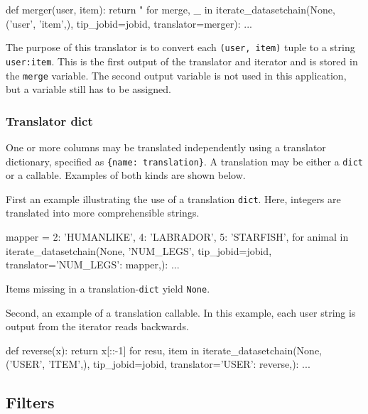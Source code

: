 \begin{python}
def merger(user, item):
    return "%
for merge, _ in iterate_datasetchain(None, ('user', 'item',), tip_jobid=jobid,
                                     translator=merger):
    ...
\end{python}
The purpose of this translator is to convert each
\texttt{(user, item)} tuple to a string \texttt{user:item}.  This is
the first output of the translator and iterator and is stored in the
\texttt{merge} variable.  The second output variable is not used in
this application, but a variable still has to be assigned.



\subsubsection*{Translator dict}

One or more columns may be translated independently using a translator
dictionary, specified as \texttt{\{name:\ translation\}}.  A
translation may be either a \texttt{dict} or a callable.  Examples of
both kinds are shown below.

First an example illustrating the use of a translation \texttt{dict}.
Here, integers are translated into more comprehensible strings.

\begin{python}
mapper = {2: 'HUMANLIKE', 4: 'LABRADOR', 5: 'STARFISH',}
for animal in iterate_datasetchain(None, 'NUM_LEGS', tip_jobid=jobid,
                                     translator={'NUM_LEGS': mapper,}):
    ...
\end{python}
Items missing in a translation-\texttt{dict} yield \texttt{None}.

Second, an example of a translation callable.  In this example, each
user string is output from the iterator reads backwards.

\begin{python}
def reverse(x):
    return x[::-1]
for resu, item in iterate_datasetchain(None, ('USER', 'ITEM',), tip_jobid=jobid,
                                       translator={'USER': reverse,}):
    ...
\end{python}



\subsection{Filters}

